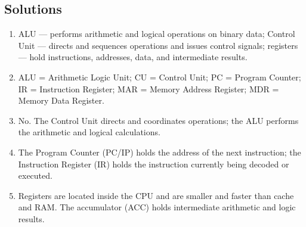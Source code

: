 \documentclass[11pt]{article}
\begin{document}
\subsection*{Solutions}
\begingroup\small
\begin{enumerate}[label=\arabic*.]
  \item ALU --- performs arithmetic and logical operations on binary data;
    Control Unit --- directs and sequences operations and issues control
    signals; registers --- hold instructions, addresses, data, and
    intermediate results.
  \item ALU = Arithmetic Logic Unit; CU = Control Unit; PC = Program
    Counter; IR = Instruction Register; MAR = Memory Address Register;
    MDR = Memory Data Register.
  \item No. The Control Unit directs and coordinates operations; the ALU
    performs the arithmetic and logical calculations.
  \item The Program Counter (PC/IP) holds the address of the next
    instruction; the Instruction Register (IR) holds the instruction
    currently being decoded or executed.
  \item Registers are located inside the CPU and are smaller and faster than
    cache and RAM. The accumulator (ACC) holds intermediate arithmetic and
    logic results.
\end{enumerate}
\endgroup
\end{document}
